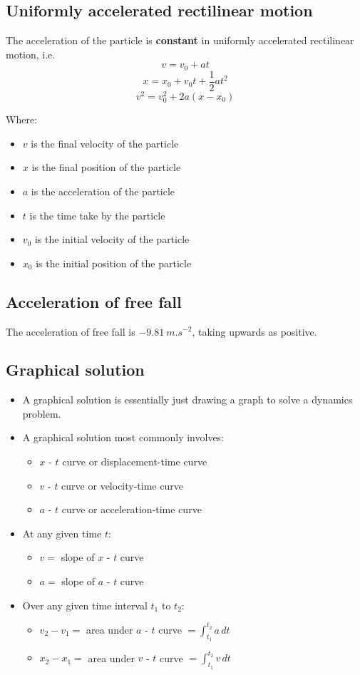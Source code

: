 \documentclass[11pt]{article}
\begin{document}
\subsection{Uniformly accelerated rectilinear motion}
\label{sec:org94b4963}
The acceleration of the particle is \textbf{constant} in uniformly accelerated rectilinear motion, i.e.
\[v = v_0 + at\]
\[x = x_0 + v_0t + \frac{1}{2}at^2\]
\[v^2 = v_0^2 + 2a(x - x_0)\]

Where:
\begin{itemize}
\item \(v\) is the final velocity of the particle
\item \(x\) is the final position of the particle
\item \(a\) is the acceleration of the particle
\item \(t\) is the time take by the particle
\item \(v_0\) is the initial velocity of the particle
\item \(x_0\) is the initial position of the particle
\end{itemize}

 \newpage
\subsection{Acceleration of free fall}
\label{sec:org1e552d6}
The acceleration of free fall is \(\qty{-9.81}{m.s^{-2}}\), taking upwards as positive.
\subsection{Graphical solution}
\label{sec:org3cddf48}
\begin{itemize}
\item A graphical solution is essentially just drawing a graph to solve a dynamics problem.
\item A graphical solution most commonly involves:
\begin{itemize}
\item \(x\) - \(t\) curve or displacement-time curve
\item \(v\) - \(t\) curve or velocity-time curve
\item \(a\) - \(t\) curve or acceleration-time curve
\end{itemize}
\item At any given time \(t\):
\begin{itemize}
\item \(v =\) slope of \(x\) - \(t\) curve
\item \(a =\) slope of \(a\) - \(t\) curve
\end{itemize}
\item Over any given time interval \(t_1\) to \(t_2\):
\begin{itemize}
\item \(v_2 - v_1 =\) area under \(a\) - \(t\) curve \(= \int_{t_1}^{t_2} a \, dt\)
\item \(x_2 - x_1 =\) area under \(v\) - \(t\) curve \(= \int_{t_1}^{t_2} v \, dt\)
\end{itemize}
\end{itemize}
\end{document}
